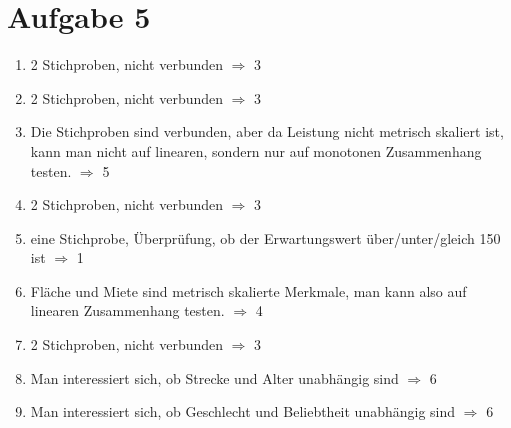 \documentclass{article}
\begin{document}
	\section*{Aufgabe 5}
	\begin{enumerate}[label=(\alph*)]
		\item 2 Stichproben, nicht verbunden $\Rightarrow$ 3
		\item 2 Stichproben, nicht verbunden $\Rightarrow$ 3
		\item Die Stichproben sind verbunden, aber da Leistung nicht metrisch skaliert ist, kann man nicht auf linearen, sondern nur auf monotonen Zusammenhang testen. $\Rightarrow$ 5
		\item 2 Stichproben, nicht verbunden $\Rightarrow$ 3
		\item eine Stichprobe, Überprüfung, ob der Erwartungswert über/unter/gleich 150 ist $\Rightarrow$ 1
		\item Fläche und Miete sind metrisch skalierte Merkmale, man kann also auf linearen Zusammenhang testen. $\Rightarrow$ 4
		\item 2 Stichproben, nicht verbunden $\Rightarrow$ 3
		\item Man interessiert sich, ob Strecke und Alter unabhängig sind $\Rightarrow$ 6
		\item Man interessiert sich, ob Geschlecht  und Beliebtheit unabhängig sind $\Rightarrow$ 6
	\end{enumerate}
\end{document}
